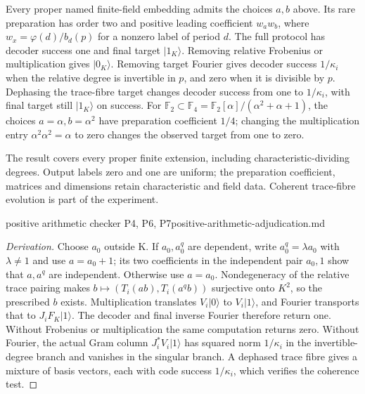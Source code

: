 \begin{proposition}
\statusProved\quad
Every proper named finite-field embedding admits the choices $a,b$ above.
Its rare preparation has order two and positive leading coefficient
$w_aw_b$, where $w_x=\varphi(d)/b_d(p)$ for a nonzero label of period $d$.
The full protocol has decoder success one and final target $|1_K\rangle$.
Removing relative Frobenius or multiplication gives $|0_K\rangle$.
Removing target Fourier gives decoder success $1/\kappa_i$ when the
relative degree is invertible in $p$, and zero when it is divisible by $p$.
Dephasing the trace-fibre target changes decoder success from one to
$1/\kappa_i$, with final target still $|1_K\rangle$ on success.
For $\mathbb F_2\subset\mathbb F_4=\mathbb F_2[\alpha]/(\alpha^2+\alpha+1)$,
the choices $a=\alpha,b=\alpha^2$ have preparation coefficient $1/4$;
changing the multiplication entry $\alpha^2\alpha^2=\alpha$ to zero
changes the observed target from one to zero.
\end{proposition}
\begin{scope}
The result covers every proper finite extension, including
characteristic-dividing degrees. Output labels zero and one are uniform;
the preparation coefficient, matrices and dimensions retain characteristic
and field data. Coherent trace-fibre evolution is part of the experiment.
\end{scope}
{positive arithmetic checker P4, P6, P7}{positive-arithmetic-adjudication.md}

\begin{proof}[Derivation]
Choose $a_0$ outside K. If $a_0,a_0^q$ are dependent, write
$a_0^q=\lambda a_0$ with $\lambda\ne1$ and use $a=a_0+1$; its two
coefficients in the independent pair $a_0,1$ show that $a,a^q$ are
independent. Otherwise use $a=a_0$. Nondegeneracy of the relative trace
pairing makes $b\mapsto(T_i(ab),T_i(a^qb))$ surjective onto $K^2$,
so the prescribed $b$ exists. Multiplication translates $V_i|0\rangle$
to $V_i|1\rangle$, and Fourier transports that to $J_iF_K|1\rangle$.
The decoder and final inverse Fourier therefore return one. Without
Frobenius or multiplication the same computation returns zero.
Without Fourier, the actual Gram column $J_i^*V_i|1\rangle$ has squared
norm $1/\kappa_i$ in the invertible-degree branch and vanishes in the
singular branch. A dephased trace fibre gives a mixture of basis vectors,
each with code success $1/\kappa_i$, which verifies the coherence test.
\end{proof}

